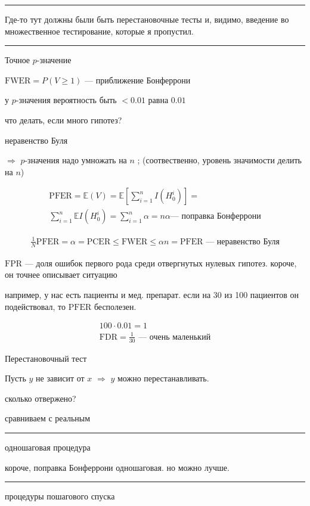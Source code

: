\documentclass{book}
\begin{document}
\hrule

Где-то тут должны были быть перестановочные тесты и, видимо, введение во множественное тестирование, которые я пропустил.

\hrule

Точное $p$-значение

$\mathrm{FWER}=P(V\geq 1)$ --- приближение Бонферрони

у $p$-значения вероятность быть $<0.01$ равна $0.01$

что делать, если много гипотез?

неравенство Буля

$\Rightarrow$ $p$-значения надо умножать на $n$ ; (соотвественно, уровень значимости делить на $n$)

\begin{gather*}
  \mathrm{PFER}=\mathbb{E}(V)=\mathbb{E}[\sum_{i=1}^{n} {I(H^i_0)}]=\\
  \sum_{i=1}^{n} {\mathbb{E}I(H_0^i)}=\sum_{i=1}^{n} {\alpha}=n\alpha \textrm{--- поправка Бонферрони}
\end{gather*}

\begin{gather*}
  \frac{1}{N}\mathrm{PFER}=\alpha=\mathrm{PCER} \leq \mathrm{FWER} \leq \alpha n=\mathrm{PFER}\textrm{ --- неравенство Буля}
\end{gather*}

$\mathrm{FPR}$ --- доля ошибок первого рода среди отвергнутых нулевых гипотез.
короче, он точнее описывает ситуацию

например, у нас есть пациенты и мед. препарат.
если на 30 из 100 пациентов он подействовал, то $\mathrm{PFER}$ бесполезен.

\begin{gather*}
  100\cdot 0.01=1\\
  \mathrm{FDR}=\frac{1}{30}\textrm{ --- очень маленький}
\end{gather*}

Перестановочный тест

Пусть $y$ не зависит от $x$ $\Rightarrow$ $y$ можно перестанавливать.

сколько отвержено?

сравниваем с реальным

\hrule

одношаговая процедура

короче, поправка Бонферрони одношаговая. но можно лучше.

\hrule

процедуры пошагового спуска
\end{document}
